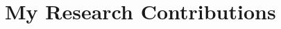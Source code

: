 \documentclass[12pt,letterpaper]{article}
\begin{document}


\section{My Research Contributions}
\end{document}
